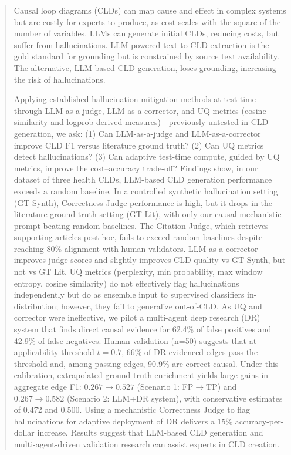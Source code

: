 \renewcommand{\abstractname}{Extended Abstract}
\begin{abstract}

%

Causal loop diagrams (CLDs) can map cause and effect in complex systems but are costly for experts to produce, as cost scales with the square of the number of variables. LLMs can generate initial CLDs, reducing costs, but suffer from hallucinations. LLM-powered text-to-CLD extraction is the gold standard for grounding but is constrained by source text availability. The alternative, LLM-based CLD generation, loses grounding, increasing the risk of hallucinations.

Applying established hallucination mitigation methods at test time---through LLM-as-a-judge, LLM-as-a-corrector, and UQ metrics (cosine similarity and logprob-derived measures)---previously untested in CLD generation, we ask: (1) Can LLM-as-a-judge and LLM-as-a-corrector improve CLD F1 versus literature ground truth? (2) Can UQ metrics detect hallucinations? (3) Can adaptive test-time compute, guided by UQ metrics, improve the cost--accuracy trade-off?
Findings show, in our dataset of three health CLDs, LLM-based CLD generation performance exceeds a random baseline. In a controlled synthetic hallucination setting (GT Synth), Correctness Judge performance is high, but it drops in the literature ground-truth setting (GT Lit), with only our causal mechanistic prompt beating random baselines. The Citation Judge, which retrieves supporting articles post hoc, fails to exceed random baselines despite reaching 80\% alignment with human validators. LLM-as-a-corrector improves judge scores and slightly improves CLD quality vs GT Synth, but not vs GT Lit.  
UQ metrics (perplexity, min probability, max window entropy, cosine similarity) do not effectively flag hallucinations independently but do as ensemble input to supervised classifiers in-distribution; however, they fail to generalize out-of-CLD. As UQ and corrector were ineffective, we pilot a multi-agent deep research (DR) system that finds direct causal evidence for 62.4\% of false positives and 42.9\% of false negatives. Human validation (n=50) suggests that at applicability threshold $t=0.7$, 66\% of DR-evidenced edges pass the threshold and, among passing edges, 90.9\% are correct-causal. Under this calibration, extrapolated ground-truth enrichment yields large gains in aggregate edge F1: $0.267 \to 0.527$ (Scenario 1: FP$\to$TP) and $0.267 \to 0.582$ (Scenario 2: LLM+DR system), with conservative estimates of 0.472 and 0.500. Using a mechanistic Correctness Judge to flag hallucinations for adaptive deployment of DR delivers a 15\% accuracy-per-dollar increase. Results suggest that LLM-based CLD generation and multi-agent-driven validation research can assist experts in CLD creation.


\end{abstract}
